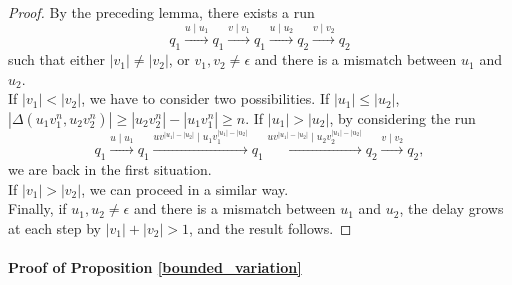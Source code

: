 \documentclass[envcountsame]{llncs}
\newcommand\delay{\Delta}
\begin{document}
\begin{proof}
By the preceding lemma, there exists a run 
$$q_1 \xrightarrow{u\mid u_1} q_1 \xrightarrow{v\mid v_1} q_1 \xrightarrow{u\mid u_2} q_2 \xrightarrow{v\mid v_2} q_2$$
such that either $|v_1| \neq |v_2|$, or $v_1,v_2 \neq \epsilon$ and there is a mismatch between $u_1$ and $u_2$.\\
If $|v_1| < |v_2|$, we have to consider two possibilities.
If $|u_1| \leq |u_2|$, $|\delay(u_1v_1^n,u_2v_2^n)| \geq |u_2v_2^n| - |u_1v_1^n| \geq n$.
If $|u_1| > |u_2|$, by considering the run
$$q_1 \xrightarrow{u\mid u_1} q_1 \xrightarrow{uv^{|u_1| - |u_2|} \mid u_1v_1^{|u_1| - |u_2|}} q_1 \xrightarrow{uv^{|u_1| - |u_2|}\mid u_2v_2^{|u_1| - |u_2|}} q_2 \xrightarrow{v\mid v_2} q_2,$$
we are back in the first situation.\\
If $|v_1| > |v_2|$, we can proceed in a similar way.\\
Finally, if $u_1,u_2 \neq \epsilon$ and there is a mismatch between $u_1$ and $u_2$, the delay grows at each step by $|v_1| + |v_2| > 1$, and the result follows.
\end{proof}

\paragraph{Proof of Proposition \ref{bounded_variation}}
\end{document}
